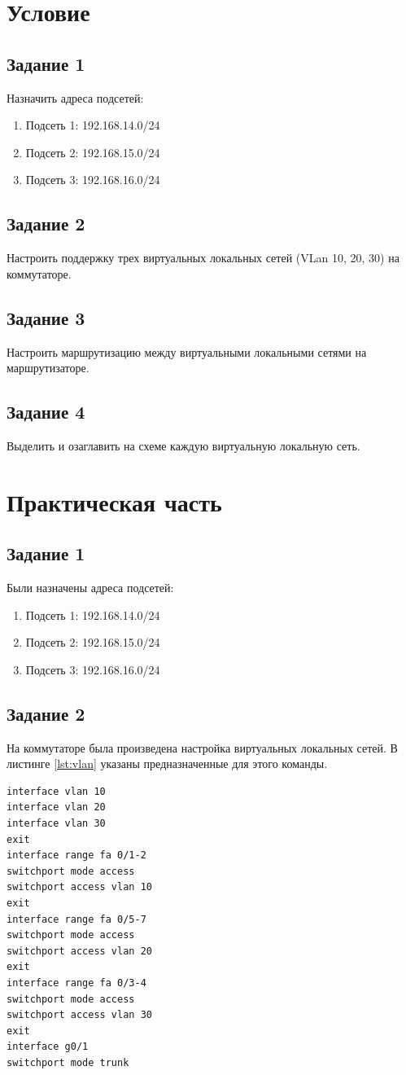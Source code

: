 \chapter{Условие}%
\label{cha:uslovie}

\section{Задание 1}
Назначить адреса подсетей:
\begin{enumerate}
    \item Подсеть 1: 192.168.14.0/24
    \item Подсеть 2: 192.168.15.0/24
    \item Подсеть 3: 192.168.16.0/24
\end{enumerate}

\section{Задание 2}
Настроить поддержку трех виртуальных локальных сетей (VLan 10, 20, 30) на коммутаторе.

\section{Задание 3}
Настроить маршрутизацию между виртуальными локальными сетями на маршрутизаторе.

\section{Задание 4}
Выделить и озаглавить на схеме каждую виртуальную локальную сеть.

\chapter{Практическая часть}%
\section{Задание 1}
Были назначены адреса подсетей:
\begin{enumerate}
    \item Подсеть 1: 192.168.14.0/24
    \item Подсеть 2: 192.168.15.0/24
    \item Подсеть 3: 192.168.16.0/24
\end{enumerate}

\section{Задание 2}
На коммутаторе была произведена настройка виртуальных локальных сетей. В листинге \ref{lst:vlan} указаны предназначенные для этого команды.
\begin{lstlisting}[frame=single,caption=Команды для настройки коммутатора,label=lst:vlan]
interface vlan 10
interface vlan 20
interface vlan 30
exit
interface range fa 0/1-2
switchport mode access
switchport access vlan 10
exit
interface range fa 0/5-7
switchport mode access
switchport access vlan 20
exit
interface range fa 0/3-4
switchport mode access
switchport access vlan 30
exit
interface g0/1
switchport mode trunk
\end{lstlisting}

